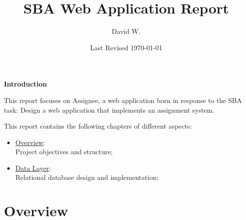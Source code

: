 \documentclass[12pt]{report}
\title{SBA Web Application Report}
\author{David W.}
\date{Last Revised \today}
\newcommand{\n}{\par}
\newcommand{\br}{\vspace{1 em}\n}
\begin{document}
\maketitle

\textbf{Introduction}
\br
This report focuses on Assignee, a web application born in response to the SBA task:
Design a web application that implements an assignment system.
\br
This report contains the following chapters of different aspects:
\begin{itemize}
	\item \hyperref[overview]{Overview}:\\
	      Project objectives and structure;
	\item \hyperref[data-layer]{Data Layer}:\\
	      Relational database design and implementation;
\end{itemize}
\tableofcontents

\chapter{Overview} \label{overview}
\end{document}
